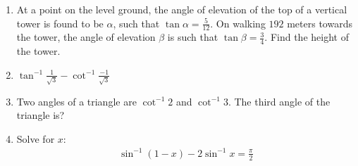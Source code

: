 \begin{enumerate}
    \hfill{}\item At a point on the level ground, the angle of elevation of the top of a vertical tower is found to be $\alpha$, such that $\tan\alpha = \frac{5}{12}$. On walking $192$ meters towards the tower, the angle of elevation $\beta$ is such that $\tan\beta = \frac{3}{4}$. Find the height of the tower.
    
    \hfill{}\item $\tan^{-1}\frac{1}{\sqrt{3}} - \cot^{-1}\frac{-1}{\sqrt{3}}$
    
    \hfill{}\item Two angles of a triangle are $\cot^{-1}2$ and $\cot^{-1}3$. The third angle of the triangle is?
    
    \hfill{}\item Solve for $x$:
    \begin{align}
        \sin^{-1}(1-x) - 2 \sin^{-1} x = \frac{\pi}{2}
    \end{align}
\hfill{}
\end{enumerate}
